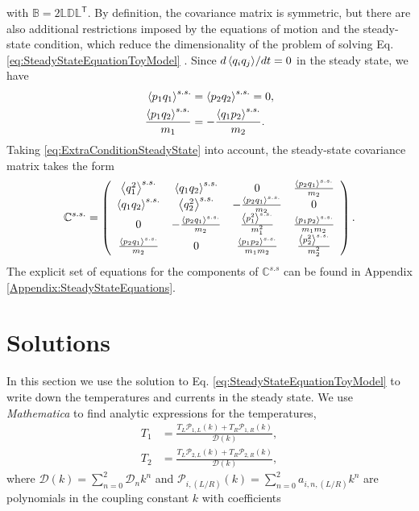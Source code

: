 %
with $\mathbb{B} = 2 \mathbb{L}\mathbb{D}\mathbb{L}^\mathsf{T}$. By definition, the covariance matrix is  symmetric, but there are also  additional restrictions imposed by the equations of motion and the steady-state condition, which reduce the dimensionality of the problem of solving Eq. \eqref{eq:SteadyStateEquationToyModel} \cite{Simon2019}. Since ${d \expval{ q_i q_j }}/{dt} = 0$ in the steady state, we have
%
\begin{align}
  \expval{ p_1 q_1}^{s.s.} &= \expval{ p_2 q_2}^{s.s.} = 0,\nonumber\\
  \frac{\expval{ p_1 q_2}^{s.s.}}{m_1}&=-\frac{\expval{ q_1 p_2}^{s.s.}}{m_2}.
  \label{eq:ExtraConditionSteadyState}
\end{align}
%
Taking \eqref{eq:ExtraConditionSteadyState} into account, the steady-state covariance matrix takes the form
%
\begin{equation}
  \begin{split}
    \mathbb{C}^{s.s.} =
    \left(
    \begin{array}{cccc}
      \expval{ q_1^2}^{s.s.}  & \expval{ q_1 q_2}^{s.s.}  & 0 & \frac{\expval{ p_2 q_1}^{s.s.} }{m_2} \\
      \expval{ q_1 q_2}^{s.s.}  & \expval{ q_2^2}^{s.s.}  & -\frac{\expval{ p_2 q_1}^{s.s.} }{m_2} & 0 \\
      0 & -\frac{\expval{ p_2 q_1}^{s.s.} }{m_2} & \frac{\expval{ p_1^2}^{s.s.} }{m_1^2} & \frac{\expval{ p_1 p_2}^{s.s.} }{m_1 m_2} \\
      \frac{\expval{ p_2 q_1}^{s.s.} }{m_2} & 0 & \frac{\expval{ p_1 p_2}^{s.s.} }{m_1 m_2} & \frac{\expval{ p_2^2}^{s.s.} }{m_2^2} \\
      \end{array}
      \right)
    \end{split}
    \label{eq:steadyStateCovarianceMatrix}\,.
\end{equation}
%
The explicit set of equations for the components of $\mathbb{C}^{s.s}$ can be found in Appendix \ref{Appendix:SteadyStateEquations}.
%
%
%
%
%
\section{Solutions\label{sec:solutions}}
%
%
%
%

%
In this section we use the solution to Eq. \eqref{eq:SteadyStateEquationToyModel} to write down the temperatures and currents in the steady state. We use {\it Mathematica} to find analytic expressions for the temperatures,
%
\begin{align}
  T_1 &= \frac{T_L \mathcal{P}_{1,L}(k) + T_R \mathcal{P}_{1,R}(k)}{\mathcal{D}(k)},\nonumber
  \\
  T_2 &= \frac{T_L \mathcal{P}_{2,L}(k) + T_R \mathcal{P}_{2,R}(k)}{\mathcal{D}(k)},
  \label{eq:ModelBTemperatures}
\end{align}
%
where $\mathcal{D}(k) =  \sum\limits_{n=0}^2 \mathcal{D}_n k^n$ and $\mathcal{P}_{i,(L/R)}(k) = \sum\limits_{n=0}^2 a_{i,n,(L/R)} k^n$ are polynomials in the coupling constant $k$ with coefficients
%

